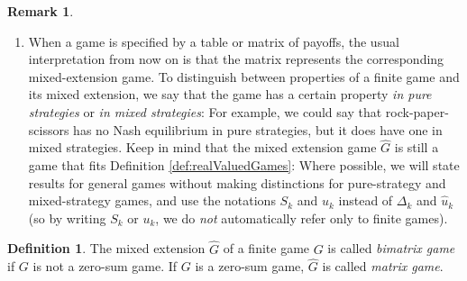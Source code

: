 \documentclass[a4paper,DIV=11,abstracton,twoside=semi]{scrreprt}
\theoremstyle{definition}
\newtheorem{defn}[thm]{Definition} %
\newtheorem{rem}[thm]{Remark}
\begin{document}
\begin{rem}
\begin{enumerate}
            \item 
            \label{item:mixedExtensionsRemark-matrixBimatrixGamesRemark}
            When a game is specified by a table or matrix of payoffs, the usual interpretation from now on is that the matrix represents the corresponding mixed-extension game.
            To distinguish between properties of a finite game and its mixed extension, we say that the game has a certain property \emph{in pure strategies} or \emph{in mixed strategies}:
            For example, we could say that rock-paper-scissors has no Nash equilibrium in pure strategies, but it does have one in mixed strategies.
            Keep in mind that the mixed extension game $\hat{G}$ is still a game that fits Definition \ref{def:realValuedGames}:
            Where possible, we will state results for general games without making distinctions for pure-strategy and mixed-strategy games, and use the notations $S_k$ and $u_k$ instead of $\Delta_k$ and $\hat{u}_k$ (so by writing $S_k$ or $u_k$, we do \emph{not} automatically refer only to finite games).
        \end{enumerate}
    \end{rem}

    \begin{defn}
        The mixed extension $\hat{G}$ of a finite game $G$ is called \emph{bimatrix game} if $G$ is not a zero-sum game.
        If $G$ is a zero-sum game, $\hat{G}$ is called \emph{matrix game}.
    \end{defn}
\end{document}
